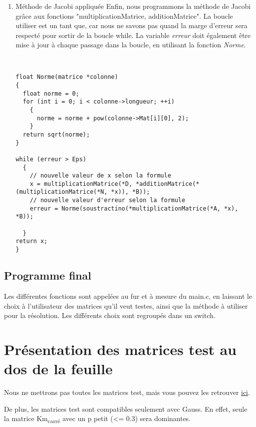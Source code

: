 \documentclass[letter]{article}
\begin{document}
\begin{enumerate}
\item Méthode de Jacobi appliquée
\label{sec:org6cfa08c}
Enfin, nous programmons la méthode de Jacobi grâce aux fonctions "multiplicationMatrice, additionMatrice".
La boucle utiliser est un tant que, car nous ne savons pas quand la marge d'erreur sera respecté pour sortir de la boucle while.
La variable \emph{erreur} doit également être mise à jour à chaque passage dans la boucle, en utilisant la fonction \emph{Norme}.



\begin{verbatim}


float Norme(matrice *colonne)
{
  float norme = 0;
  for (int i = 0; i < colonne->longueur; ++i)
    {
      norme = norme + pow(colonne->Mat[i][0], 2);
    }
  return sqrt(norme);
}

while (erreur > Eps)
  {
    // nouvelle valeur de x selon la formule
    x = multiplicationMatrice(*D, *additionMatrice(*(multiplicationMatrice(*N, *x)), *B));
    // nouvelle valeur d'erreur selon la formule
    erreur = Norme(soustractino(*multiplicationMatrice(*A, *x), *B));

  }
return x;
}

\end{verbatim}
\end{enumerate}

\subsection{Programme final}
\label{sec:org5adf5f0}

Les différentes fonctions sont appelées au fur et à mesure du main.c, en laissant le choix à l'utilisateur des matrices qu'il veut testes, ainsi que la méthode à utiliser pour la résolution. Les différents choix sont regroupés dans un switch.



\section{Présentation des matrices test au dos de la feuille}
\label{sec:orga16caa4}

Nous ne mettrons pas toutes les matrices test, mais vous pouvez les retrouver \href{matricetest.c}{ici}.


De plus, les matrices test sont compatibles seulement avec Gauss. En effet, seule la matrice Km\textsubscript{carré} avec un p petit (<= 0.3) sera dominantes.
\end{document}
